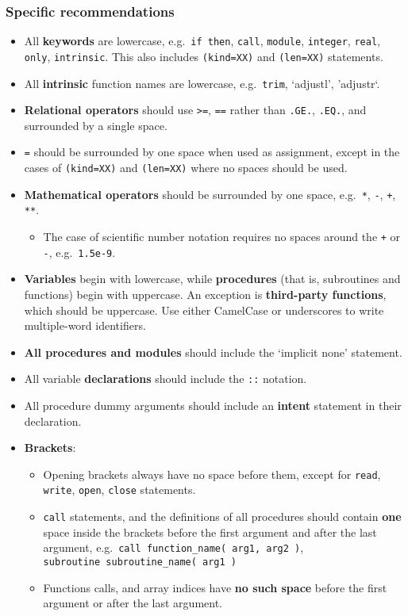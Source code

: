 \subsubsection{Specific recommendations} \label{specific-recommendations}

\begin{itemize}
\item All \textbf{keywords} are lowercase, e.g.~\texttt{if\ then},
\texttt{call}, \texttt{module}, \texttt{integer}, \texttt{real},
\texttt{only}, \texttt{intrinsic}. This also includes
\texttt{(kind=XX)} and \texttt{(len=XX)} statements.
\item All \textbf{intrinsic} function names are lowercase,
e.g.~\texttt{trim}, `adjustl', 'adjustr`.
\item \textbf{Relational operators} should use
\texttt{\textgreater{}=}, \texttt{==} rather than \texttt{.GE.},
\texttt{.EQ.}, and surrounded by a single space.
\item \texttt{=} should be surrounded by one space when used as
assignment, except in the cases of \texttt{(kind=XX)} and
\texttt{(len=XX)} where no spaces should be used.
\item \textbf{Mathematical operators} should be surrounded by one
space, e.g.~\texttt{*}, \texttt{-}, \texttt{+}, \texttt{**}.
  \begin{itemize}
  \item The case of scientific number notation requires no spaces
around the \texttt{+} or \texttt{-}, e.g.~\texttt{1.5e-9}.
  \end{itemize}
\item \textbf{Variables} begin with lowercase, while
\textbf{procedures} (that is, subroutines and functions) begin with
uppercase. An exception is \textbf{third-party functions}, which
should be uppercase. Use either CamelCase or underscores to write
multiple-word identifiers.
\item \textbf{All procedures and modules} should include the `implicit
none' statement.
\item All variable \textbf{declarations} should include the
\texttt{::} notation.
\item All procedure dummy arguments should include an \textbf{intent}
statement in their declaration.
\item \textbf{Brackets}:
  \begin{itemize}
  \item Opening brackets always have no space before them, except for
\texttt{read}, \texttt{write}, \texttt{open}, \texttt{close}
statements.
  \item \texttt{call} statements, and the definitions of all
procedures should contain \textbf{one} space inside the brackets
before the first argument and after the last argument,
e.g.~\texttt{call\ function\_name(\ arg1,\ arg2\ )},
\texttt{subroutine\ subroutine\_name(\ arg1\ )}
  \item Functions calls, and array indices have \textbf{no such space}
before the first argument or after the last argument.
  \end{itemize}
\end{itemize}

